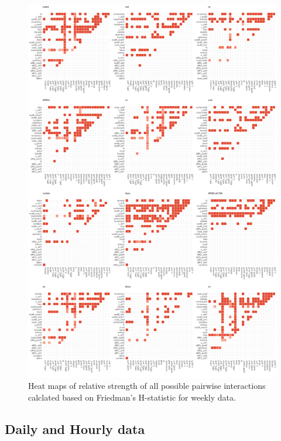 \documentclass[11pt,a4paper,]{article}
\begin{document}
\begin{figure}
\centering
\includegraphics{figures/friedmanHW-1.png}
\caption{\label{fig:friedmanHW}Heat maps of relative strength of all
possible pairwise interactions calclated based on Friedman's H-statistic
for weekly data.}
\end{figure}

\newpage

\subsection{Daily and Hourly data}\label{daily-and-hourly-data}
\end{document}
